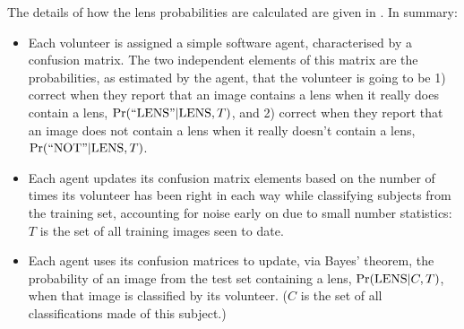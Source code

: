 \documentclass[useAMS,usenatbib,a4paper]{mn2e}
\begin{document}
The details of how the lens probabilities are calculated are given in
. In summary:
\begin{itemize}

\item Each volunteer is assigned a simple software agent, characterised by a
confusion matrix. The two independent elements of this matrix are the
probabilities, as estimated by the agent, that the volunteer is going to be 1)
correct when they report that an image contains a lens when it really does
contain a lens, ${\rm Pr}({\rm ``LENS"}|{\rm LENS},T)$, and 2) correct when they report that
an image does not contain a lens when it really doesn't contain a lens,
${\rm Pr}({\rm ``NOT"}|{\rm LENS},T)$.

\item Each agent updates its confusion matrix elements based on the number of
times its volunteer has been right in each way while classifying subjects from
the training set, accounting for noise early on due to small number
statistics: $T$ is the set of all training images seen to date.

\item Each agent uses its confusion matrices to update, via Bayes' theorem,
the probability of an image from the test set containing a lens,
${\rm Pr}({\rm LENS}|C,T)$, when that image is classified by its volunteer. ($C$ is the
set of all classifications made of this subject.)

\end{itemize}
\end{document}
